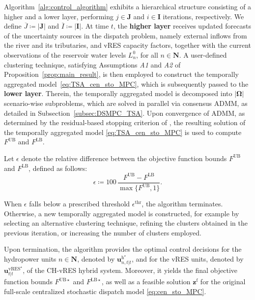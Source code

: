 \documentclass[a4paper,fleqn]{cas-sc}
\begin{document}
Algorithm~\ref{alg:control_algorithm} exhibits a hierarchical structure consisting of a higher and a lower layer, performing $j \in \boldsymbol{J}$ and $i \in \boldsymbol{I}$ iterations, respectively.
We define $\overline{J} \coloneqq |\boldsymbol{J}|$ and $\overline{I} \coloneqq |\boldsymbol{I}|$.
At time $t$, the \textbf{higher layer} receives updated forecasts of the uncertainty sources in the dispatch problem,
namely external inflows from the river and its tributaries, and vRES capacity factors,
together with the current observations of the reservoir water levels $L^0_n$, for all $n \in \boldsymbol{N}$.
A user-defined clustering technique, satisfying Assumptions \textit{A1} and \textit{A2} of Proposition~\ref{prop:main_result}, is then employed to construct the temporally aggregated model~\eqref{eq:TSA_cen_sto_MPC}, which is subsequently passed to the \textbf{lower layer}.
Therein, the temporally aggregated model is decomposed into $|\boldsymbol{\Omega}|$ scenario-wise subproblems,
which are solved in parallel via consensus ADMM, as detailed in Subsection~\ref{subsec:DSMPC_TSA}.
Upon convergence of ADMM, as determined by the residual-based stopping criterion of \cite{boyd2010distributed}, the resulting solution of the temporally aggregated model \eqref{eq:TSA_cen_sto_MPC} is used to compute $F^{\mathrm{UB}}$ and $F^{\mathrm{LB}}$.

Let $\epsilon$ denote the relative difference between the objective function bounds $F^{\mathrm{UB}}$ and $F^{\mathrm{LB}}$, defined as follows:
\begin{equation}
\epsilon \coloneqq 100 \, \frac{F^{\mathrm{UB}} - F^{\mathrm{LB}}}{\max\{F^{\mathrm{UB}}, 1\}}.
\label{eq:opt_gap}
\end{equation}

When $\epsilon$ falls below a prescribed threshold $\epsilon^{\mathrm{thr}}$, the algorithm terminates. 
Otherwise, a new temporally aggregated model is constructed,
for example by selecting an alternative clustering technique, refining the clusters obtained in the previous iteration, or increasing the number of clusters employed.

Upon termination, the algorithm provides the optimal control decisions for the hydropower units $n \in \boldsymbol{N}$,
denoted by $\boldsymbol{u}^{\boldsymbol{\mathrm{h}}^{\star}}_{n,t|t}$,
and for the vRES units,
denoted by $\boldsymbol{u}^{\boldsymbol{\mathrm{vRES}}^{\star}}_{t|t}$,
of the CH-vRES hybrid system.
Moreover, it yields the final objective function bounds $F^{\mathrm{UB}\star}$ and $F^{\mathrm{LB}\star}$, as well as a feasible solution $\boldsymbol{z^\mathrm{f}}$ for the original full-scale centralized stochastic dispatch model \eqref{eq:cen_sto_MPC}.
\end{document}
